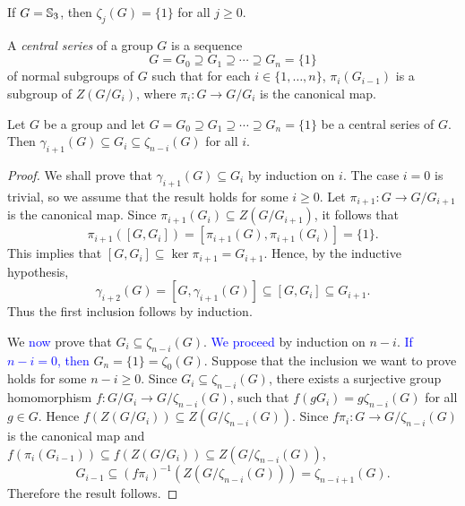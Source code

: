 \begin{example}
	If $G=\mathbb{S}_3$, then $\zeta_j(G)=\{1\}$ for all $j\geq 0$.
	\end{example}

A {\em central series} of a group $G$ is a sequence
\[
	G=G_0\supseteq G_1\supseteq\cdots\supseteq G_n=\{1\}
\]
of normal subgroups of $G$ such that for each $i\in\{1,\dots,n\}$, 
$\pi_i(G_{i-1})$ is a subgroup of $Z(G/G_i)$, where $\pi_i\colon G\to
G/G_i$ is the canonical map. 

\begin{proposition}
	\label{pro:serie_central}
	Let $G$ be a group and let $G=G_0\supseteq G_1\supseteq\cdots\supseteq G_n=\{1\}$
	be a central series of $G$. Then $\gamma_{i+1}(G)\subseteq G_i\subseteq \zeta_{n-i}(G)$ for all $i$.
\end{proposition}

\begin{proof}
    We shall prove that $\gamma_{i+1}(G)\subseteq G_i$ by induction on $i$. 
	The case $i=0$ is trivial, so we assume that 
	the result holds for some 
	$i\geq 0$. 
	Let $\pi_{i+1}\colon G\to G/G_{i+1}$ is the canonical map. 
	Since $\pi_{i+1}(G_{i})\subseteq Z(G/G_{i+1})$, it follows that
	\[
	\pi_{i+1}([G,G_{i}])=[\pi_{i+1}(G),\pi_{i+1}(G_{i})]=\{1\}.
	\]
	This implies that $[G,G_{i}]\subseteq\ker\pi_{i+1}=G_{i+1}$. Hence, by the inductive hypothesis,
	\[
	\gamma_{i+2}(G)=[G,\gamma_{i+1}(G)]\subseteq [G,G_{i}]\subseteq G_{i+1}. 
	\] Thus the first inclusion follows by induction.
	
	We \textcolor{blue}{now} prove that $G_i\subseteq \zeta_{n-i}(G)$. \textcolor{blue}{We proceed} by induction on $n-i$. \textcolor{blue}{If $n-i=0$, then} $G_n=\{ 1\}=\zeta_0(G)$. Suppose that the
	inclusion we want to prove holds for some $n-i\geq 0$. Since $G_i\subseteq \zeta_{n-i}(G)$, there exists a surjective group homomorphism
	$f\colon G/G_i\rightarrow G/\zeta_{n-i}(G)$, such that $f(gG_i)=g\zeta_{n-i}(G)$ for all $g\in G$. 
	Hence $f(Z(G/G_i))\subseteq Z(G/\zeta_{n-i}(G))$. Since  $f\pi_i\colon G\rightarrow G/\zeta_{n-i}(G)$ is the canonical map and
	$f(\pi_i(G_{i-1}))\subseteq f(Z(G/G_i))\subseteq Z(G/\zeta_{n-i}(G))$, 
	\[
	G_{i-1}\subseteq (f\pi_i)^{-1}(Z(G/\zeta_{n-i}(G)))=\zeta_{n-i+1}(G).
	\]
	Therefore the result follows.
\end{proof}






